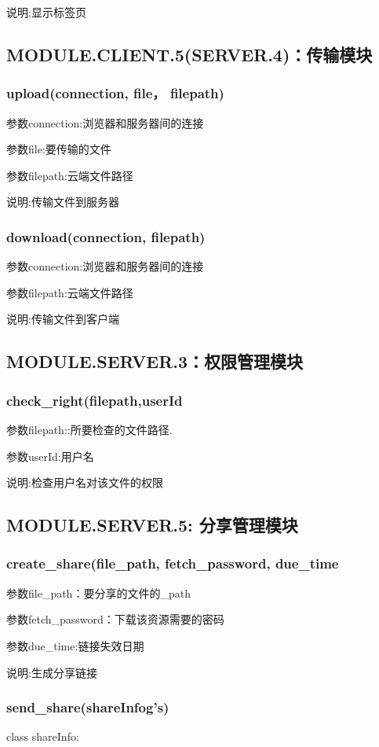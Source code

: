 说明:显示标签页
\subsection{MODULE.CLIENT.5(SERVER.4)：传输模块}
\subsubsection{upload(connection, file， filepath)}
参数connection:浏览器和服务器间的连接

参数file:要传输的文件

参数filepath:云端文件路径

说明:传输文件到服务器
\subsubsection{download(connection, filepath)}

参数connection:浏览器和服务器间的连接

参数filepath:云端文件路径

说明:传输文件到客户端
\subsection{MODULE.SERVER.3：权限管理模块}
\subsubsection{check\_right(filepath,userId}
参数filepath::所要检查的文件路径.

参数userId:用户名

说明:检查用户名对该文件的权限

\subsection{MODULE.SERVER.5: 分享管理模块}
\subsubsection{create\_share(file\_path, fetch\_password, due\_time}
参数file\_path：要分享的文件的\_path

参数fetch\_password：下载该资源需要的密码

参数due\_time:链接失效日期

说明:生成分享链接

\subsubsection{send\_share(shareInfog's)}
class shareInfo:

